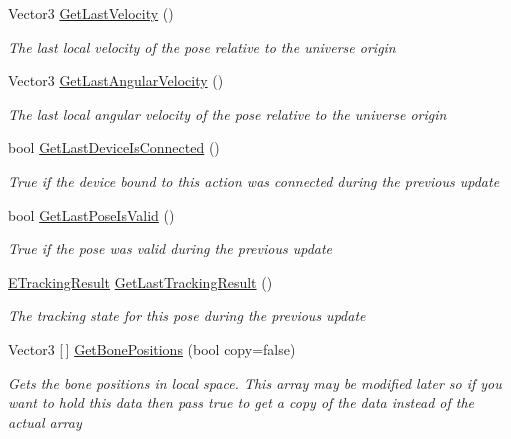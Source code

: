 \begin{DoxyCompactItemize}
Vector3 \mbox{\hyperlink{class_valve_1_1_v_r_1_1_steam_v_r___action___skeleton_afb56cc4c7eee341e315587c4407472b3}{Get\+Last\+Velocity}} ()
\begin{DoxyCompactList}\small\item\em The last local velocity of the pose relative to the universe origin \end{DoxyCompactList}\item 
Vector3 \mbox{\hyperlink{class_valve_1_1_v_r_1_1_steam_v_r___action___skeleton_a5d0fd95a106853daf5b4969a95427c76}{Get\+Last\+Angular\+Velocity}} ()
\begin{DoxyCompactList}\small\item\em The last local angular velocity of the pose relative to the universe origin \end{DoxyCompactList}\item 
bool \mbox{\hyperlink{class_valve_1_1_v_r_1_1_steam_v_r___action___skeleton_af2dfd31fde98f66696406d9f78c82e34}{Get\+Last\+Device\+Is\+Connected}} ()
\begin{DoxyCompactList}\small\item\em True if the device bound to this action was connected during the previous update \end{DoxyCompactList}\item 
bool \mbox{\hyperlink{class_valve_1_1_v_r_1_1_steam_v_r___action___skeleton_a748a0907d02ce3413edc7e656272aca2}{Get\+Last\+Pose\+Is\+Valid}} ()
\begin{DoxyCompactList}\small\item\em True if the pose was valid during the previous update \end{DoxyCompactList}\item 
\mbox{\hyperlink{namespace_valve_1_1_v_r_abe6feab98f33191b7c27b4292012e90a}{E\+Tracking\+Result}} \mbox{\hyperlink{class_valve_1_1_v_r_1_1_steam_v_r___action___skeleton_ad84ef6df0708c1397e3168658508d57c}{Get\+Last\+Tracking\+Result}} ()
\begin{DoxyCompactList}\small\item\em The tracking state for this pose during the previous update \end{DoxyCompactList}\item 
Vector3 \mbox{[}$\,$\mbox{]} \mbox{\hyperlink{class_valve_1_1_v_r_1_1_steam_v_r___action___skeleton_a60b0e6ad569249120cd0fdfb25086cc2}{Get\+Bone\+Positions}} (bool copy=false)
\begin{DoxyCompactList}\small\item\em Gets the bone positions in local space. This array may be modified later so if you want to hold this data then pass true to get a copy of the data instead of the actual array \end{DoxyCompactList}\item 

\end{DoxyCompactItemize}
